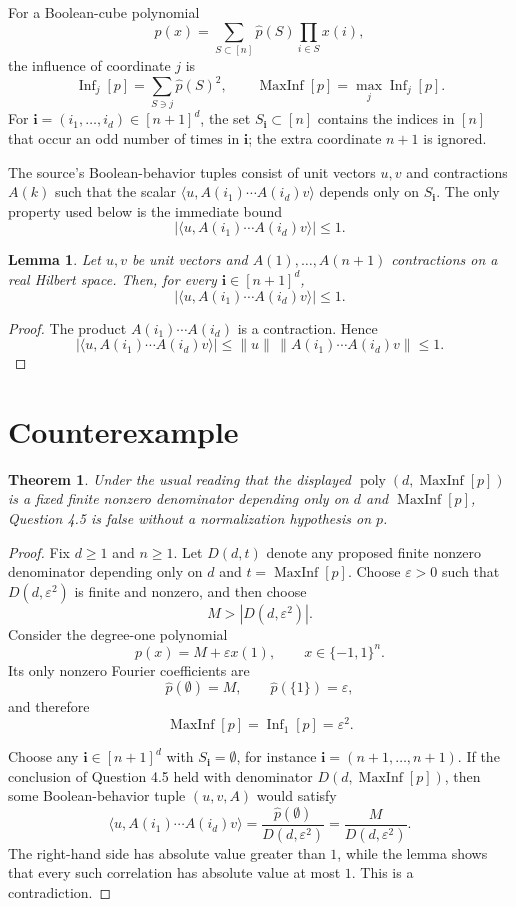 \documentclass[11pt]{article}
\newtheorem{theorem}{Theorem}
\newtheorem{lemma}{Lemma}
\newcommand{\MaxInf}{\operatorname{MaxInf}}
\newcommand{\Inf}{\operatorname{Inf}}
\begin{document}
For a Boolean-cube polynomial
\[
p(x)=\sum_{S\subset[n]}\widehat p(S)\prod_{i\in S}x(i),
\]
the influence of coordinate \(j\) is
\[
\Inf_j[p]=\sum_{S\ni j}\widehat p(S)^2,
\qquad
\MaxInf[p]=\max_j \Inf_j[p].
\]
For \(\mathbf i=(i_1,\ldots,i_d)\in[n+1]^d\), the set \(S_{\mathbf i}\subset[n]\)
contains the indices in \([n]\) that occur an odd number of times in
\(\mathbf i\); the extra coordinate \(n+1\) is ignored.

The source's Boolean-behavior tuples consist of unit vectors \(u,v\) and
contractions \(A(k)\) such that the scalar
\(\langle u,A(i_1)\cdots A(i_d)v\rangle\) depends only on
\(S_{\mathbf i}\).  The only property used below is the immediate bound
\[
\left|\langle u,A(i_1)\cdots A(i_d)v\rangle\right|\le 1.
\]

\begin{lemma}
Let \(u,v\) be unit vectors and \(A(1),\ldots,A(n+1)\) contractions on a real
Hilbert space.  Then, for every \(\mathbf i\in[n+1]^d\),
\[
\left|\langle u,A(i_1)\cdots A(i_d)v\rangle\right|\le 1.
\]
\end{lemma}

\begin{proof}
The product \(A(i_1)\cdots A(i_d)\) is a contraction.  Hence
\[
|\langle u,A(i_1)\cdots A(i_d)v\rangle|
\le \|u\|\,\|A(i_1)\cdots A(i_d)v\|
\le 1.
\]
\end{proof}

\section*{Counterexample}

\begin{theorem}
Under the usual reading that the displayed
\(\operatorname{poly}(d,\MaxInf[p])\) is a fixed finite nonzero denominator
depending only on \(d\) and \(\MaxInf[p]\), Question 4.5 is false without a
normalization hypothesis on \(p\).
\end{theorem}

\begin{proof}
Fix \(d\ge 1\) and \(n\ge 1\).  Let \(D(d,t)\) denote any proposed finite
nonzero denominator depending only on \(d\) and \(t=\MaxInf[p]\).  Choose
\(\varepsilon>0\) such that \(D(d,\varepsilon^2)\) is finite and nonzero, and
then choose
\[
M>|D(d,\varepsilon^2)|.
\]
Consider the degree-one polynomial
\[
p(x)=M+\varepsilon x(1),\qquad x\in\{-1,1\}^n.
\]
Its only nonzero Fourier coefficients are
\[
\widehat p(\emptyset)=M,\qquad \widehat p(\{1\})=\varepsilon,
\]
and therefore
\[
\MaxInf[p]=\Inf_1[p]=\varepsilon^2.
\]

Choose any \(\mathbf i\in[n+1]^d\) with \(S_{\mathbf i}=\emptyset\), for
instance \(\mathbf i=(n+1,\ldots,n+1)\).  If the conclusion of Question 4.5
held with denominator \(D(d,\MaxInf[p])\), then some Boolean-behavior tuple
\((u,v,A)\) would satisfy
\[
\langle u,A(i_1)\cdots A(i_d)v\rangle
=\frac{\widehat p(\emptyset)}{D(d,\varepsilon^2)}
=\frac{M}{D(d,\varepsilon^2)}.
\]
The right-hand side has absolute value greater than \(1\), while the lemma
shows that every such correlation has absolute value at most \(1\).  This is a
contradiction.
\end{proof}
\end{document}
